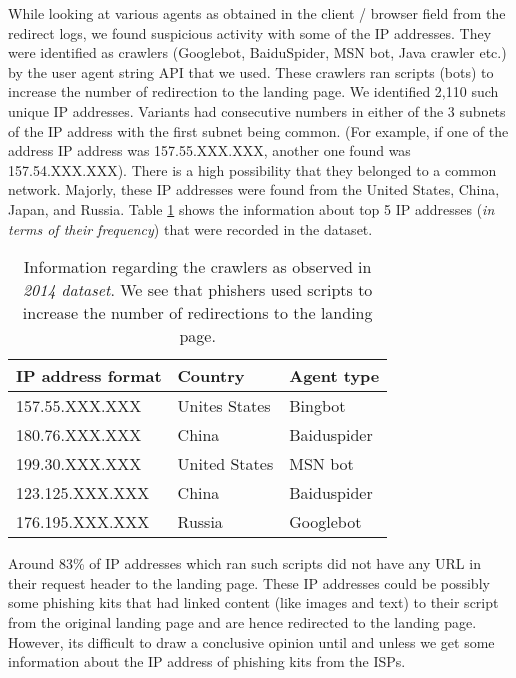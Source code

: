 \documentclass[conference]{IEEEtran}
\begin{document}
While looking at various agents as obtained in the client / browser field from the redirect logs, we found suspicious activity with some of the IP addresses. They were identified as crawlers (Googlebot, BaiduSpider, MSN bot, Java crawler etc.) by the user agent string API that we used. These crawlers ran scripts (bots) to increase the number of redirection to the landing page. We identified 2,110 such unique IP addresses. Variants had consecutive numbers in either of the 3 subnets of the IP address with the first subnet being common. (For example, if one of the address IP address was 157.55.XXX.XXX, another one found was 157.54.XXX.XXX). There is a high possibility that they belonged to a common network. Majorly, these IP addresses were found from the United States, China, Japan, and Russia. Table \ref{tab:crawler} shows the information about top 5 IP addresses (\textit{in terms of their frequency}) that were recorded in the dataset.
\begin{table}[h]
\centering
\caption{Information regarding the crawlers as observed in \textit{2014 dataset}. We see that phishers used scripts to increase the number of redirections to the landing page.}
\label{tab:crawler}
\begin{small}
\begin{tabular}{|p{2.75cm}|p{1.5cm}|p{1.5cm}|} \hline

\small IP address format &\small Country &\small Agent type\\ \hline
157.55.XXX.XXX & Unites States & Bingbot \\ \hline
180.76.XXX.XXX & China & Baiduspider \\ \hline
199.30.XXX.XXX & United States & MSN bot  \\ \hline
123.125.XXX.XXX & China & Baiduspider  \\ \hline
176.195.XXX.XXX & Russia & Googlebot  \\ \hline

\end{tabular}
\end{small}
\end{table}
\newline\indent
Around 83\% of IP addresses which ran such scripts did not have any URL in their request header to the landing page. These IP addresses could be possibly some phishing kits that had linked content (like images and text) to their script from the original landing page and are hence redirected to the landing page. However, its difficult to draw a conclusive opinion until and unless we get some information about the IP address of phishing kits from the ISPs.
\end{document}
